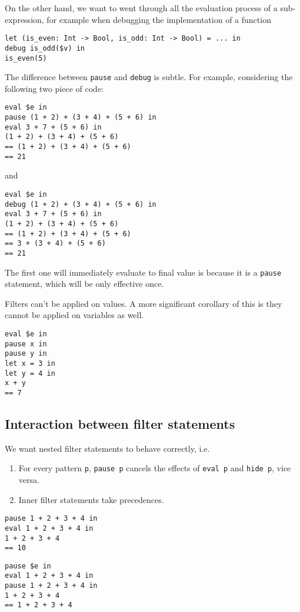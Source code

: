 On the other hand, we want to went through all the evaluation process of a
sub-expression, for example when debugging the implementation of a function
\begin{verbatim}
let (is_even: Int -> Bool, is_odd: Int -> Bool) = ... in
debug is_odd($v) in
is_even(5)
\end{verbatim}

The difference between \verb|pause| and \verb|debug| is subtle. For
example, considering the following two piece of code:
\begin{verbatim}
eval $e in
pause (1 + 2) + (3 + 4) + (5 + 6) in
eval 3 + 7 + (5 + 6) in
(1 + 2) + (3 + 4) + (5 + 6)
== (1 + 2) + (3 + 4) + (5 + 6)
== 21
\end{verbatim}
and
\begin{verbatim}
eval $e in
debug (1 + 2) + (3 + 4) + (5 + 6) in
eval 3 + 7 + (5 + 6) in
(1 + 2) + (3 + 4) + (5 + 6)
== (1 + 2) + (3 + 4) + (5 + 6)
== 3 + (3 + 4) + (5 + 6)
== 21
\end{verbatim}
The first one will immediately evaluate to final value is because it is a \verb|pause| statement, which will be only effective once.

Filters can't be applied on values. A more significant corollary of this is they cannot be applied on variables as well.
\begin{verbatim}
eval $e in
pause x in
pause y in
let x = 3 in
let y = 4 in
x + y
== 7
\end{verbatim}

\subsection{Interaction between filter statements}


We want nested filter statements to behave correctly, i.e.
\begin{enumerate}
\item For every pattern \verb|p|, \verb|pause p| cancels the effects
  of \verb|eval p| and \verb|hide p|, vice versa.
\item Inner filter statements take precedences.
\end{enumerate}

\begin{verbatim}
pause 1 + 2 + 3 + 4 in
eval 1 + 2 + 3 + 4 in
1 + 2 + 3 + 4
== 10
\end{verbatim}

\begin{verbatim}
pause $e in
eval 1 + 2 + 3 + 4 in
pause 1 + 2 + 3 + 4 in
1 + 2 + 3 + 4
== 1 + 2 + 3 + 4
\end{verbatim}

